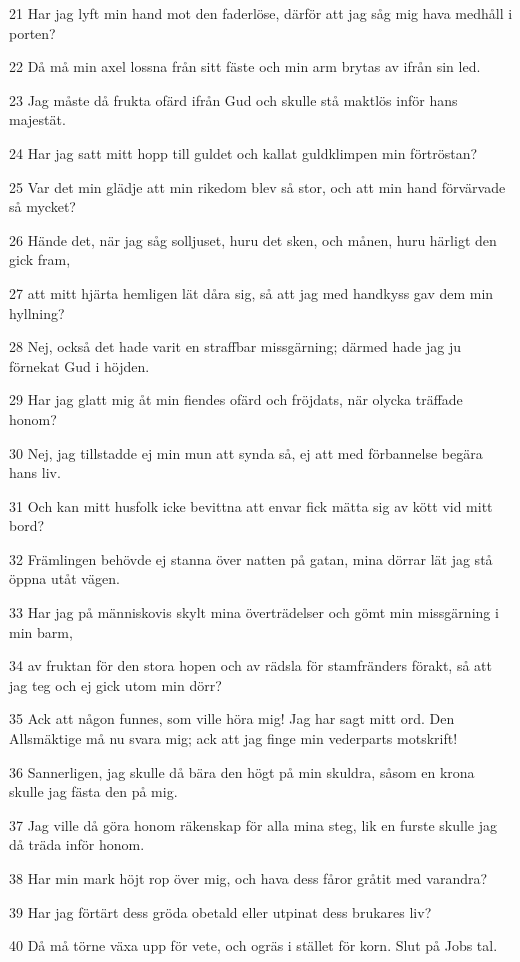 \par 21 Har jag lyft min hand mot den faderlöse, därför att jag såg mig hava medhåll i porten?
\par 22 Då må min axel lossna från sitt fäste och min arm brytas av ifrån sin led.
\par 23 Jag måste då frukta ofärd ifrån Gud och skulle stå maktlös inför hans majestät.
\par 24 Har jag satt mitt hopp till guldet och kallat guldklimpen min förtröstan?
\par 25 Var det min glädje att min rikedom blev så stor, och att min hand förvärvade så mycket?
\par 26 Hände det, när jag såg solljuset, huru det sken, och månen, huru härligt den gick fram,
\par 27 att mitt hjärta hemligen lät dåra sig, så att jag med handkyss gav dem min hyllning?
\par 28 Nej, också det hade varit en straffbar missgärning; därmed hade jag ju förnekat Gud i höjden.
\par 29 Har jag glatt mig åt min fiendes ofärd och fröjdats, när olycka träffade honom?
\par 30 Nej, jag tillstadde ej min mun att synda så, ej att med förbannelse begära hans liv.
\par 31 Och kan mitt husfolk icke bevittna att envar fick mätta sig av kött vid mitt bord?
\par 32 Främlingen behövde ej stanna över natten på gatan, mina dörrar lät jag stå öppna utåt vägen.
\par 33 Har jag på människovis skylt mina överträdelser och gömt min missgärning i min barm,
\par 34 av fruktan för den stora hopen och av rädsla för stamfränders förakt, så att jag teg och ej gick utom min dörr?
\par 35 Ack att någon funnes, som ville höra mig! Jag har sagt mitt ord. Den Allsmäktige må nu svara mig; ack att jag finge min vederparts motskrift!
\par 36 Sannerligen, jag skulle då bära den högt på min skuldra, såsom en krona skulle jag fästa den på mig.
\par 37 Jag ville då göra honom räkenskap för alla mina steg, lik en furste skulle jag då träda inför honom.
\par 38 Har min mark höjt rop över mig, och hava dess fåror gråtit med varandra?
\par 39 Har jag förtärt dess gröda obetald eller utpinat dess brukares liv?
\par 40 Då må törne växa upp för vete, och ogräs i stället för korn. Slut på Jobs tal.

